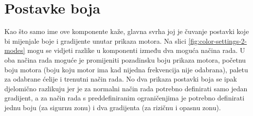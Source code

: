 \documentclass[times, utf8, diplomski]{fer}
\begin{document}
\section{Postavke boja} \label{color-settings-section}
Kao što samo ime ove komponente kaže, glavna svrha joj je čuvanje postavki koje bi mijenjale boje i gradijente unutar prikaza motora. Na slici \ref{fig:color-settings-2-modes} mogu se vidjeti razlike u komponenti između dva moguća načina rada. U oba načina rada moguće je promijeniti pozadinsku boju prikaza motora, početnu boju motora (boju koju motor ima kad nijedna frekvencija nije odabrana), paletu za odabrane ćelije i trenutni način rada. No dva prikaza postavki boja se ipak djelomično razlikuju jer je za normalni način rada potrebno definirati samo jedan gradijent, a za način rada s preddefiniranim ograničenjima je potrebno definirati jednu boju (za sigurnu zonu) i dva gradijenta (za rizičnu i opasnu zonu).
\end{document}
